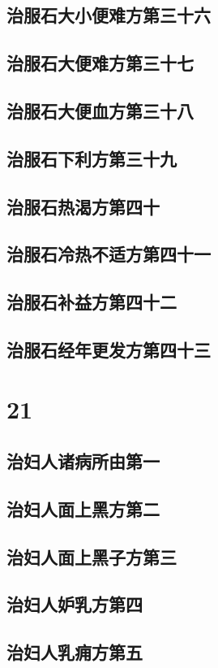 \documentclass[a4paper,12pt,UTF8,twoside]{ctexbook}
\begin{document}
\chapter{治服石大小便难方第三十六}
\chapter{治服石大便难方第三十七}
\chapter{治服石大便血方第三十八}
\chapter{治服石下利方第三十九}
\chapter{治服石热渴方第四十}
\chapter{治服石冷热不适方第四十一}
\chapter{治服石补益方第四十二}
\chapter{治服石经年更发方第四十三}

\part{21}
\chapter{治妇人诸病所由第一}
\chapter{治妇人面上黑方第二}
\chapter{治妇人面上黑子方第三}
\chapter{治妇人妒乳方第四}
\chapter{治妇人乳痈方第五}
\end{document}
